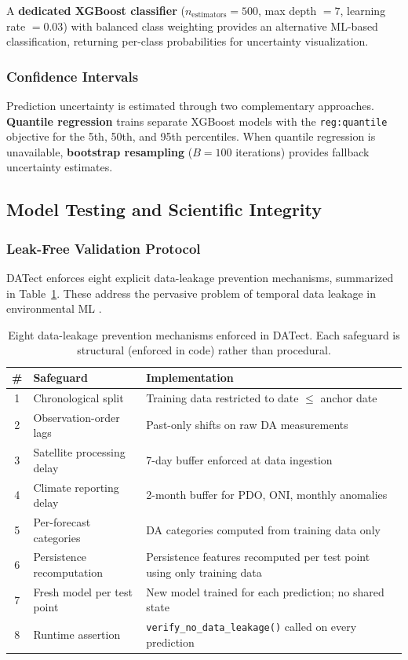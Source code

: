 \documentclass[preprint,12pt,authoryear]{elsarticle}
\begin{document}
A \textbf{dedicated XGBoost classifier} ($n_{\text{estimators}} = 500$, max depth $= 7$, learning rate $= 0.03$) with balanced class weighting provides an alternative ML-based classification, returning per-class probabilities for uncertainty visualization.

\subsubsection{Confidence Intervals}

Prediction uncertainty is estimated through two complementary approaches. \textbf{Quantile regression} \citep{Koenker1978} trains separate XGBoost models with the \texttt{reg:quantile} objective for the 5th, 50th, and 95th percentiles. When quantile regression is unavailable, \textbf{bootstrap resampling} \citep{Efron1979} ($B = 100$ iterations) provides fallback uncertainty estimates.

\subsection{Model Testing and Scientific Integrity}
\label{sec:validation}

\subsubsection{Leak-Free Validation Protocol}

DATect enforces eight explicit data-leakage prevention mechanisms, summarized in Table~\ref{tab:leakage-safeguards}. These address the pervasive problem of temporal data leakage in environmental ML \citep{Kapoor2023, Roberts2017}.

\begin{table}[!htbp]
\centering
\caption{Eight data-leakage prevention mechanisms enforced in DATect. Each safeguard is structural (enforced in code) rather than procedural.}
\label{tab:leakage-safeguards}
\small
\begin{tabular}{@{}clp{7cm}@{}}
\toprule
\textbf{\#} & \textbf{Safeguard} & \textbf{Implementation} \\
\midrule
1 & Chronological split & Training data restricted to date $\leq$ anchor date \\
2 & Observation-order lags & Past-only shifts on raw DA measurements \\
3 & Satellite processing delay & 7-day buffer enforced at data ingestion \\
4 & Climate reporting delay & 2-month buffer for PDO, ONI, monthly anomalies \\
5 & Per-forecast categories & DA categories computed from training data only \\
6 & Persistence recomputation & Persistence features recomputed per test point using only training data \\
7 & Fresh model per test point & New model trained for each prediction; no shared state \\
8 & Runtime assertion & \texttt{verify\_no\_data\_leakage()} called on every prediction \\
\bottomrule
\end{tabular}
\end{table}
\end{document}
